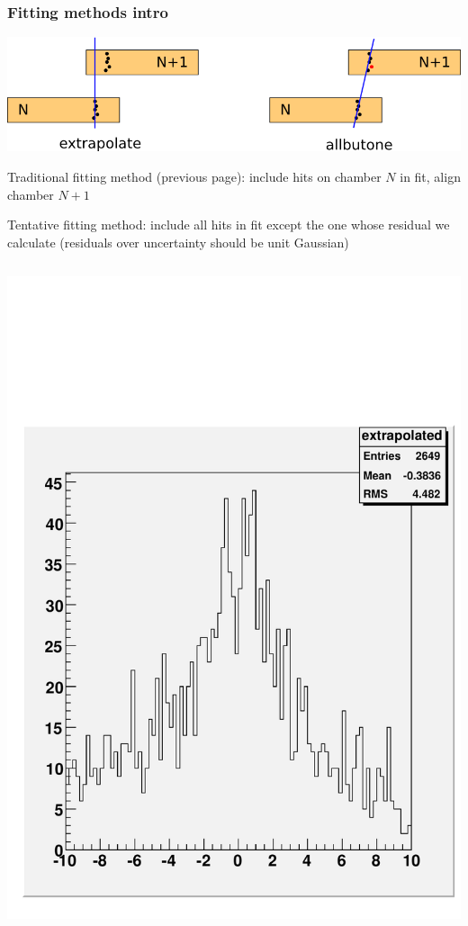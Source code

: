 \documentclass[compress]{beamer}
\begin{document}
\begin{frame}
\frametitle{Fitting methods intro}
\small

\begin{center}
\includegraphics[width=0.7\linewidth]{fitting_methods.png}
\end{center}

Traditional fitting method (previous page): include hits on chamber $N$ in fit, align chamber $N+1$

\vspace{0.2 cm}
Tentative fitting method: include all hits in fit except the one whose
residual we calculate (residuals over uncertainty should be unit
Gaussian)

\vspace{0.2 cm}
\begin{columns}
\includegraphics[width=\linewidth]{extrapolated_ME+211.pdf}


\end{columns}
\end{frame}
\end{document}
